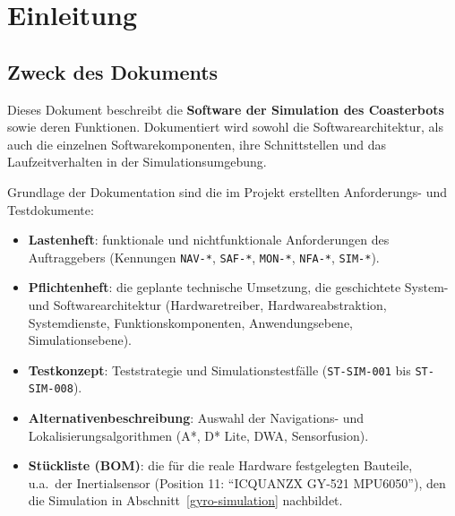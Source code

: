 \documentclass[
  a4paper,
  12pt,
  DIV=12,        %
  parskip=half,  %
  headings=small %
]{scrartcl}
\theoremstyle{definition}
\providecommand{\tightlist}{%
  \setlength{\itemsep}{0pt}\setlength{\parskip}{0pt}}
\theoremstyle{definition}
\begin{document}
\newpage

\tableofcontents

\newpage

\setlength{\emergencystretch}{3em}

\section{Einleitung}\label{einleitung}

\subsection{Zweck des Dokuments}\label{zweck-des-dokuments}

Dieses Dokument beschreibt die \textbf{Software der Simulation des
Coasterbots} sowie deren Funktionen. Dokumentiert wird sowohl die
Softwarearchitektur, als auch die einzelnen Softwarekomponenten, ihre
Schnittstellen und das Laufzeitverhalten in der Simulationsumgebung.

Grundlage der Dokumentation sind die im Projekt erstellten
Anforderungs- und Testdokumente:

\begin{itemize}
\tightlist
\item
  \textbf{Lastenheft}: funktionale und nichtfunktionale Anforderungen
  des Auftraggebers (Kennungen \texttt{NAV-*}, \texttt{SAF-*},
  \texttt{MON-*}, \texttt{NFA-*}, \texttt{SIM-*}).
\item
  \textbf{Pflichtenheft}: die geplante technische Umsetzung,
  die geschichtete System- und Softwarearchitektur (Hardwaretreiber,
  Hardwareabstraktion, Systemdienste, Funktionskomponenten,
  Anwendungsebene, Simulationsebene).
\item
  \textbf{Testkonzept}: Teststrategie und Simulationstestfälle
  (\texttt{ST-SIM-001} bis \texttt{ST-SIM-008}).
\item
  \textbf{Alternativenbeschreibung}: Auswahl der Navigations- und
  Lokalisierungsalgorithmen (A*, D* Lite, DWA, Sensorfusion).
\item
  \textbf{Stückliste (BOM)}: die für die reale Hardware festgelegten
  Bauteile, u.a.\ der Inertialsensor (Position 11: \enquote{ICQUANZX
  GY-521 MPU6050}), den die Simulation in Abschnitt~\ref{gyro-simulation}
  nachbildet.
\end{itemize}
\end{document}
